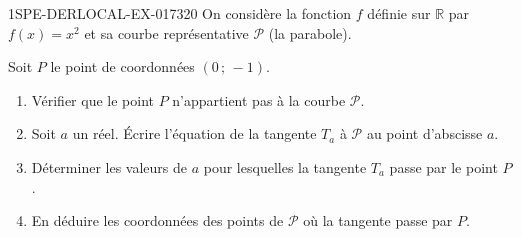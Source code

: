 \begin{exercice}{1SPE-DERLOCAL-EX-017}{3}{20}
On considère la fonction $f$ définie sur $\mathbb{R}$ par $f(x) = x^2$ et sa courbe représentative $\mathcal{P}$ (la parabole).

Soit $P$ le point de coordonnées $(0\,;\,-1)$.

\begin{enumerate}
  \item Vérifier que le point $P$ n'appartient pas à la courbe $\mathcal{P}$.
  \item Soit $a$ un réel. Écrire l'équation de la tangente $T_a$ à $\mathcal{P}$ au point d'abscisse $a$.
  \item Déterminer les valeurs de $a$ pour lesquelles la tangente $T_a$ passe par le point $P$.
  \item En déduire les coordonnées des points de $\mathcal{P}$ où la tangente passe par $P$.
\end{enumerate}
\end{exercice}
